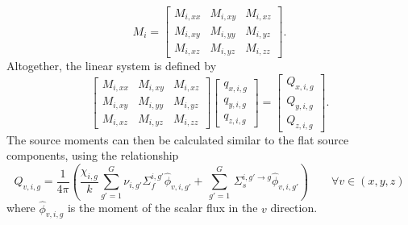 \begin{equation}
M_i = 
\begin{bmatrix}
M_{i,xx} & M_{i,xy}  & M_{i,xz} \\
M_{i,xy} & M_{i,yy}  & M_{i,yz} \\
M_{i,xz} & M_{i,yz}  & M_{i,zz}
\end{bmatrix}.
\label{eq:linear-moment-matrix}
\end{equation}
Altogether, the linear system is defined by
\begin{equation}
\begin{bmatrix}
M_{i,xx} & M_{i,xy}  & M_{i,xz} \\
M_{i,xy} & M_{i,yy}  & M_{i,yz} \\
M_{i,xz} & M_{i,yz}  & M_{i,zz}
\end{bmatrix}
\begin{bmatrix}
q_{x,i,g} \\
q_{y,i,g} \\
q_{z,i,g}
\end{bmatrix}
=
\begin{bmatrix}
Q_{x,i,g} \\
Q_{y,i,g} \\
Q_{z,i,g}
\end{bmatrix}
.
\label{eq:moments-linear-sys}
\end{equation}
The source moments can then be calculated similar to the flat source components, using the relationship
\begin{equation}
Q_{v,i,g} = \frac{1}{4 \pi} \left( \frac{\chi_{i,g}}{k} \sum_{g'=1}^{G} \nu_{i,g'} \Sigma_f^{i,g'} \hat{\phi}_{v,i,g'} + \, \sum_{g'=1}^G \,  \Sigma_{s}^{i,g' \rightarrow g} \hat{\phi}_{v,i,g'} \right) \qquad \forall v \in (x,y,z)
\end{equation}
where $\hat{\phi}_{v,i,g}$ is the moment of the scalar flux in the $v$ direction. 


